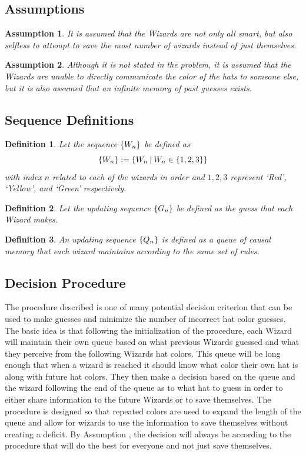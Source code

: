 \documentclass[]{article}
\newcommand{\st}{ \ \vline \ }
\newtheorem{definition}{Definition}
\newtheorem{assumption}{Assumption}
\begin{document}
\subsection*{Assumptions}
\begin{assumption}\label{asmp:selfless}
    It is assumed that the Wizards are not only all smart, but also selfless to attempt to 
    save the most number of wizards instead of just themselves.
\end{assumption}
\begin{assumption}
    Although it is not stated in the problem, it is assumed that the Wizards 
    are unable to directly communicate the color of the hats to someone else, 
    but it is also assumed that an infinite memory of past guesses exists.
\end{assumption}

\subsection*{Sequence Definitions}
\begin{definition}
    Let the sequence $\qty{W_n}$ be defined as
    $$\qty{W_n} := \qty{W_n \st W_n \in \{1,2,3\}}$$
    with index $n$ related to each of the wizards in order and 
    $1,2,3$ represent `Red', `Yellow', and `Green' respectively.
\end{definition}
\begin{definition}
    Let the updating sequence $\qty{G_n}$ be defined as the guess that each Wizard makes.
\end{definition}
\begin{definition}
    An updating sequence $\qty{Q_n}$ is defined as a queue of causal memory that each wizard 
    maintains according to the same set of rules.
\end{definition}
\subsection*{Decision Procedure}
The procedure described is one of many potential decision criterion that can be used to 
make guesses and minimize the number of incorrect hat color guesses. The basic idea 
is that following the initialization of the procedure, each Wizard will maintain their own 
queue based on what previous Wizards guessed and what they perceive from the following 
Wizards hat colors. This queue will be long enough that when a wizard is reached it should 
know what color their own hat is along with future hat colors. They then make a decision based 
on the queue and the wizard following the end of the queue as to what hat to guess in order 
to either share information to the future Wizards or to save themselves. The procedure is 
designed so that repeated colors are used to expand the length of the queue and allow 
for wizards to use the information to save themselves without creating a deficit.
By Assumption , the decision will always be according to the procedure 
that will do the best for everyone and not just save themselves.
\end{document}
